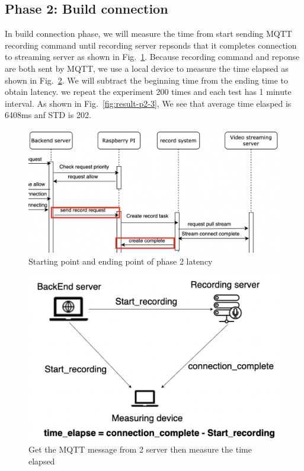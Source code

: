 \subsection{Phase 2: Build connection}
In build connection phase, we will measure the time from start sending MQTT recording command until recording server repsonds that it completes connection to streaming server as shown in Fig.~\ref{fig:result-p2-1}. Because recording command and reponse are both sent by MQTT, we use a local device to measure the time elapsed as shown in Fig.~\ref{fig:result-p2-2}. We will subtract the beginning time from the ending time to obtain latency. we repeat the experiment 200 times and each test has 1 minute interval. As shown in Fig.~\ref{fig:result-p2-3}, We see that average time elasped is 6408ms anf STD is 202. 

\begin{figure}[H]
    \centering
    \includegraphics[width=\textwidth]{figsrc/result-p2-1.png}
    \caption{Starting point and ending point of phase 2 latency\label{fig:result-p2-1}}
\end{figure}

\begin{figure}[H]
    \centering
    \includegraphics[width=\textwidth]{figsrc/result-p2-2.png}
    \caption{Get the MQTT message from 2 server then measure the time elapsed\label{fig:result-p2-2}}
\end{figure}


